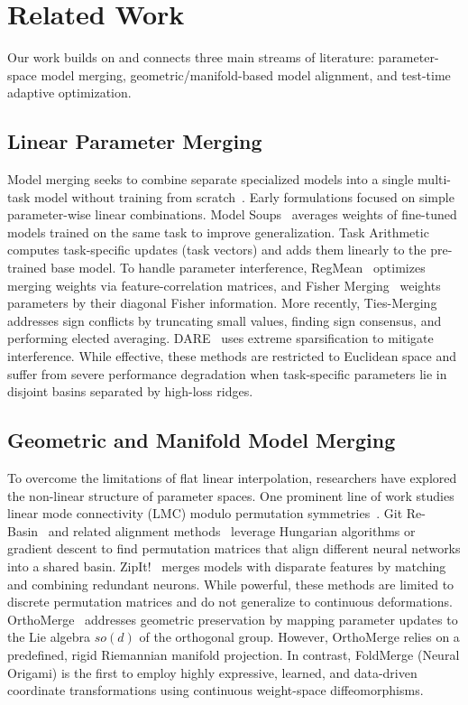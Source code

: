 \section{Related Work}
\label{sec:related_work}

Our work builds on and connects three main streams of literature: parameter-space model merging, geometric/manifold-based model alignment, and test-time adaptive optimization.

\subsection{Linear Parameter Merging}
Model merging seeks to combine separate specialized models into a single multi-task model without training from scratch~\cite{choshen2022fusing, donyehiya2023cold}. 
Early formulations focused on simple parameter-wise linear combinations. 
Model Soups~\cite{wortsman2022model} averages weights of fine-tuned models trained on the same task to improve generalization. 
Task Arithmetic~\cite{ilharco2022editing} computes task-specific updates (task vectors) and adds them linearly to the pre-trained base model. 
To handle parameter interference, RegMean~\cite{jin2023regmean} optimizes merging weights via feature-correlation matrices, and Fisher Merging~\cite{matena2022merging} weights parameters by their diagonal Fisher information. 
More recently, Ties-Merging~\cite{yadav2023resolving} addresses sign conflicts by truncating small values, finding sign consensus, and performing elected averaging. 
DARE~\cite{yu2023language} uses extreme sparsification to mitigate interference. 
While effective, these methods are restricted to Euclidean space and suffer from severe performance degradation when task-specific parameters lie in disjoint basins separated by high-loss ridges.

\subsection{Geometric and Manifold Model Merging}
To overcome the limitations of flat linear interpolation, researchers have explored the non-linear structure of parameter spaces. 
One prominent line of work studies linear mode connectivity (LMC) modulo permutation symmetries~\cite{entezari2021role, garipov2018loss}. 
Git Re-Basin~\cite{ainsworth2022git} and related alignment methods~\cite{jordan2022repair, juneja2023linear} leverage Hungarian algorithms or gradient descent to find permutation matrices that align different neural networks into a shared basin. 
ZipIt!~\cite{zhang2023zipit} merges models with disparate features by matching and combining redundant neurons. 
While powerful, these methods are limited to discrete permutation matrices and do not generalize to continuous deformations. 
OrthoMerge~\cite{yang2026orthomerge} addresses geometric preservation by mapping parameter updates to the Lie algebra $so(d)$ of the orthogonal group. 
However, OrthoMerge relies on a predefined, rigid Riemannian manifold projection. 
In contrast, FoldMerge (Neural Origami) is the first to employ highly expressive, learned, and data-driven coordinate transformations using continuous weight-space diffeomorphisms.

